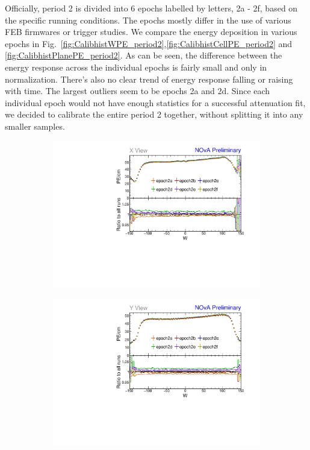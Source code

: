 Officially, period 2 is divided into 6 epochs labelled by letters, 2a - 2f, based on the specific running conditions. The epochs mostly differ in the use of various FEB firmwares or trigger studies. We compare the energy deposition in various epochs in Fig.~\ref{fig:CalibhistWPE_period2},\ref{fig:CalibhistCellPE_period2} and \ref{fig:CalibhistPlanePE_period2}. As can be seen, the difference between the energy response across the individual epochs is fairly small and only in normalization. There's also no clear trend of energy response falling or raising with time. The largest outliers seem to be epochs 2a and 2d. Since each individual epoch would not have enough statistics for a successful attenuation fit, we decided to calibrate the entire period 2 together, without splitting it into any smaller samples.

\begin{figure}[h]
\centering
\begin{subfigure}[b]{0.495\textwidth}
\centering
\includegraphics[width=\textwidth]{Plots/TBCalibration/Attenprofs_P2Data_WPE_corr_xy_X_Combined.pdf}
\end{subfigure}
\begin{subfigure}[b]{0.495\textwidth}
\centering
\includegraphics[width=\textwidth]{Plots/TBCalibration/Attenprofs_P2Data_WPE_corr_xy_Y_Combined.pdf}

\end{subfigure}
\end{figure}
